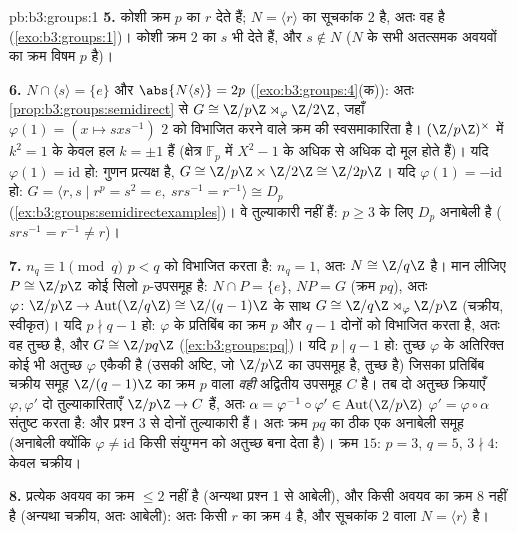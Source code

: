 \begin{solution}{pb:b3:groups:1}
\textbf{5.} कोशी क्रम $p$ का $r$ देते हैं; $N = \langle r
\rangle$ का सूचकांक
$2$ है, अतः वह  है (\cref{exo:b3:groups:1})। कोशी क्रम $2$ का $s$
भी देते हैं, और $s \notin N$ ($N$ के सभी अतत्समक अवयवों का क्रम विषम
$p$ है)।

\textbf{6.} $N \cap \langle s \rangle = \{e\}$ और $\abs{N\langle
s\rangle} = 2p$ (\cref{exo:b3:groups:4}(क)): अतः \cref{prop:b3:groups:semidirect} से $G \cong \Z/p\Z \rtimes_\varphi
\Z/2\Z$, जहाँ
$\varphi(1) = (x \mapsto sxs^{-1})$ $2$ को विभाजित करने वाले क्रम की स्वसमाकारिता है। $(\Z/p\Z)^\times$ में
$k^2 = 1$ के केवल हल $k = \pm 1$ हैं (क्षेत्र $\mathbb F_p$ में $X^2 - 1$ के अधिक से अधिक
दो मूल होते हैं)। यदि $\varphi(1) = \mathrm{id}$ हो: गुणन प्रत्यक्ष है, $G \cong \Z/p\Z \times \Z/2\Z \cong \Z/2p\Z$। यदि $\varphi(1) = -\mathrm{id}$
हो: $G = \langle r, s \mid r^p = s^2 = e,
\ srs^{-1} = r^{-1}\rangle \cong D_p$ (\cref{ex:b3:groups:semidirectexamples})। वे तुल्याकारी नहीं हैं: $p \geq 3$ के लिए $D_p$
अनाबेली है ($srs^{-1} = r^{-1} \neq r$)।

\textbf{7.} $n_q \equiv 1 \pmod q$ $p < q$ को विभाजित करता है: $n_q = 1$, अतः $N \cong \Z/q\Z$
 है। मान लीजिए $P \cong \Z/p\Z$ कोई सिलो $p$-उपसमूह है: $N \cap P = \{e\}$,
$NP = G$ (क्रम $pq$), अतः $\varphi \colon \Z/p\Z
\to \operatorname{Aut}(\Z/q\Z) \cong \Z/(q-1)\Z$ के साथ $G
\cong \Z/q\Z \rtimes_\varphi \Z/p\Z$ (चक्रीय, स्वीकृत)। यदि
$p \nmid q - 1$ हो: $\varphi$ के प्रतिबिंब का क्रम $p$ और $q-1$ दोनों को विभाजित
करता है, अतः वह तुच्छ है, और $G \cong
\Z/pq\Z$ (\cref{ex:b3:groups:pq})। यदि $p \mid q - 1$ हो: तुच्छ
$\varphi$ के अतिरिक्त कोई भी अतुच्छ $\varphi$ एकैकी है (उसकी अष्टि, जो $\Z/p\Z$
का उपसमूह है, तुच्छ है) जिसका प्रतिबिंब चक्रीय समूह $\Z/(q-1)\Z$ का क्रम
$p$ वाला \emph{वही} अद्वितीय उपसमूह $C$ है। तब दो अतुच्छ क्रियाएँ
$\varphi, \varphi'$ दो तुल्याकारिताएँ $\Z/p\Z \to C$ हैं, अतः $\alpha =
\varphi^{-1}\circ\varphi' \in \operatorname{Aut}(\Z/p\Z)$ $\varphi' = \varphi\circ\alpha$ संतुष्ट करता है:
और प्रश्न 3 से दोनों  तुल्याकारी हैं। अतः क्रम
$pq$ का ठीक एक अनाबेली समूह (अनाबेली क्योंकि $\varphi \neq
\mathrm{id}$ किसी संयुग्मन
को अतुच्छ बना देता है)। क्रम $15$: $p =
3$, $q = 5$, $3 \nmid 4$: केवल
चक्रीय।

\textbf{8.} प्रत्येक अवयव का क्रम $\leq 2$ नहीं है (अन्यथा प्रश्न 1
से आबेली), और किसी अवयव का क्रम $8$ नहीं है (अन्यथा चक्रीय, अतः
आबेली): अतः किसी $r$ का क्रम $4$ है, और सूचकांक $2$ वाला
$N = \langle r\rangle$  है।


\end{solution}
